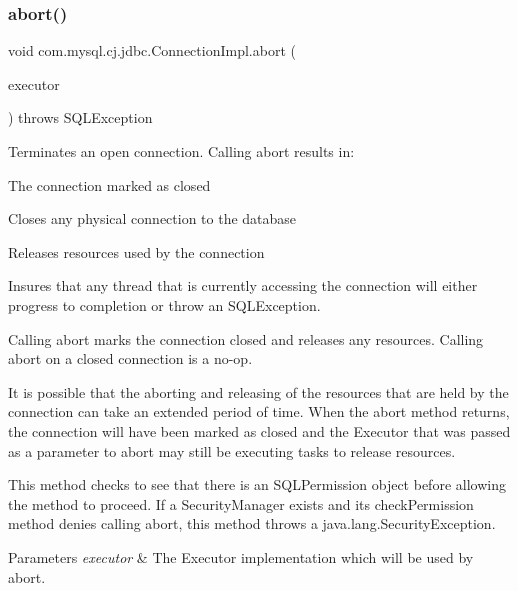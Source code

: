 \subsubsection{\texorpdfstring{abort()}{abort()}}
{\footnotesize\ttfamily void com.\+mysql.\+cj.\+jdbc.\+Connection\+Impl.\+abort (\begin{DoxyParamCaption}\item[{Executor}]{executor }\end{DoxyParamCaption}) throws S\+Q\+L\+Exception}

Terminates an open connection. Calling {\ttfamily abort} results in\+: 
\begin{DoxyItemize}
\item The connection marked as closed 
\item Closes any physical connection to the database 
\item Releases resources used by the connection 
\item Insures that any thread that is currently accessing the connection will either progress to completion or throw an {\ttfamily S\+Q\+L\+Exception}. 
\end{DoxyItemize}

Calling {\ttfamily abort} marks the connection closed and releases any resources. Calling {\ttfamily abort} on a closed connection is a no-\/op. 

It is possible that the aborting and releasing of the resources that are held by the connection can take an extended period of time. When the {\ttfamily abort} method returns, the connection will have been marked as closed and the {\ttfamily Executor} that was passed as a parameter to abort may still be executing tasks to release resources. 

This method checks to see that there is an {\ttfamily S\+Q\+L\+Permission} object before allowing the method to proceed. If a {\ttfamily Security\+Manager} exists and its {\ttfamily check\+Permission} method denies calling {\ttfamily abort}, this method throws a {\ttfamily java.\+lang.\+Security\+Exception}.


\begin{DoxyParams}{Parameters}
{\em executor} & The {\ttfamily Executor} implementation which will be used by {\ttfamily abort}. \\
\hline
\end{DoxyParams}

